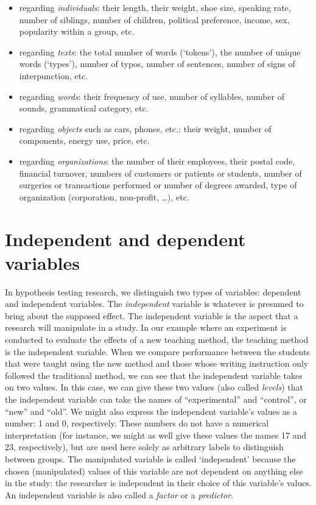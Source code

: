 \documentclass[
]{book}
\begin{document}
\begin{itemize}
\item
  regarding \emph{individuals}: their length, their weight, shoe size, speaking rate, number of siblings, number of children, political preference, income, sex, popularity within a group, etc.
\item
  regarding \emph{texts}: the total number of words (`tokens'), the number of unique words (`types'), number of typos, number of sentences, number of signs of interpunction, etc.
\item
  regarding \emph{words}: their frequency of use, number of syllables, number of sounds, grammatical category, etc.
\item
  regarding \emph{objects} such as cars, phones, etc.: their weight, number of components, energy use, price, etc.
\item
  regarding \emph{organizations}: the number of their employees, their postal code, financial turnover, numbers of customers or patients or students, number of surgeries or transactions performed or number of degrees awarded, type of organization (corporation, non-profit, \ldots), etc.
\end{itemize}

\hypertarget{sec:independendependentvariables}{%
\section{Independent and dependent variables}\label{sec:independendependentvariables}}

In hypothesis testing research, we distinguish two types of variables: dependent and independent variables. The \emph{independent} variable is whatever is presumed to bring about the supposed effect. The independent variable is the aspect that a research will manipulate in a study. In our example where an experiment is conducted to evaluate the effects of a new teaching method, the teaching method is the independent variable. When we compare performance between the students that were taught using the new method and those whose writing instruction only followed the traditional method, we can see that the independent variable takes on two values. In this case, we can give these two values (also called \emph{levels}) that the independent variable can take the names of ``experimental'' and ``control'', or ``new'' and ``old''. We might also express the independent variable's values as a number: 1 and 0, respectively. These numbers do not have a numerical interpretation (for instance, we might as well give these values the names 17 and 23, respectively), but are used here solely as arbitrary labels to distinguish between groups. The manipulated variable is called `independent' because the chosen (manipulated) values of this variable are not dependent on anything else in the study: the researcher is independent in their choice of this variable's values. An independent variable is also called a \emph{factor} or a \emph{predictor}.
\end{document}
